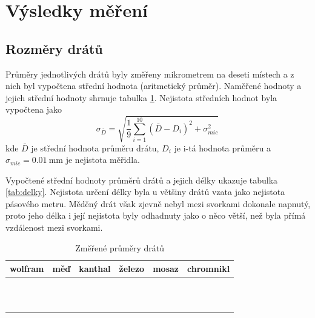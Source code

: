 \documentclass{../concepts/prepareprotokol} %
\begin{document}
\section{Výsledky měření}

\subsection{Rozměry drátů} \label{rozmery}

Průměry jednotlivých drátů byly změřeny mikrometrem na deseti místech a z nich byl 
vypočtena střední hodnota (aritmetický průměr). Naměřené hodnoty a jejich střední 
hodnoty shrnuje tabulka \ref{tab:prumer}. Nejistota středních hodnot byla vypočtena jako 
\begin{equation}
    \sigma_{\bar{D}} = \sqrt{\frac{1}{9} \sum_{i=1}^{10} (\bar{D} - D_i)^2 + \sigma_{mic}^2} \,
\end{equation}
kde $\bar{D}$ je střední hodnota průměru drátu, $D_i$ je i-tá hodnota průměru a 
$\sigma_{mic}=\SI{0.01}{\milli\metre}$ je nejistota měřidla.

Vypočtené střední hodnoty průměrů drátů a jejich délky ukazuje tabulka \ref{tab:delky}. 
Nejistota určení délky byla u většiny drátů vzata jako nejistota pásového metru. Měděný 
drát však zjevně nebyl mezi svorkami dokonale napnutý, proto jeho délka i její nejistota 
byly odhadnuty jako o něco větší, než byla přímá vzdálenost mezi svorkami.

\begin{table}[!hbtp]
\centering
\caption{Změřené průměry drátů}
\begin{tabular}{cccccc}
 \toprule
 wolfram & měď & kanthal & železo & mosaz & chromnikl \\
 \midrule
 
& & & & & \\
 & & & & & \\
 & & & & & \\
 & & & & & \\
 & & & & & \\
 & & & & & \\
 & & & & & \\
 & & & & & \\
 & & & & & \\
 & & & & & \\
 
 \midrule

 & & & & & \\
 
 \bottomrule
\end{tabular}
\label{tab:prumer}
\end{table}
\end{document}
